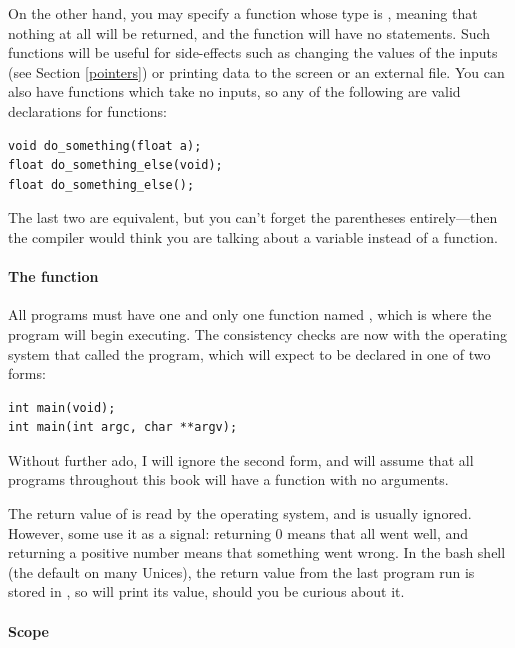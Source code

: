 \documentclass[12pt]{article}
\makeatletter
\def\ind#1{\index{#1}#1}
\def\cind#1{\index{#1@\cinline{#1}}\cinline{#1}}
\def\cindex#1{\index{#1@\cinline{#1}}}
\makeatother
\begin{document}
On the other hand,  you may specify a function whose type is \cind{void},
meaning that nothing at all will be returned, and the function will
have no  statements. Such functions will be useful for
side-effects such as changing the values of the inputs (see Section
\ref{pointers}) or printing data to the screen or an external file. You
can also have functions which take no inputs, so any of the following
are valid declarations for functions:

\begin{lstlisting}
void do_something(float a);
float do_something_else(void);
float do_something_else();
\end{lstlisting}

The last two are equivalent, but you can't forget the parentheses
entirely---then the compiler would think you are talking about a variable
instead of a function.

\paragraph{\treesymbol{} The  function}\cindex{main}
All programs must have one and only one function named ,
which is where the program will begin executing. The consistency checks
are now with the operating system that called the program, which will
expect  to be declared in one of two forms:

\begin{lstlisting}
int main(void);
int main(int argc, char **argv);
\end{lstlisting}

Without further ado, I will ignore the second form, and will assume that
all programs throughout this book will have a  function
with no arguments.

The return value of  is read by the operating system,
and is usually ignored. However, some use it as a signal:  returning
0 means that all went well, and returning a positive number means that
something went wrong. In the \ind{bash} shell (the default on many
Unices), the return value from the last program run is stored in
, so  will print its value, should you
be curious about it.

\paragraph{Scope}	\label{scope}
\end{document}
